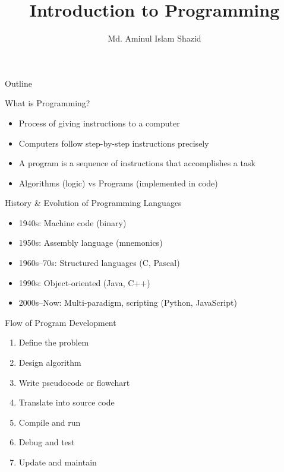 \documentclass[12pt, aspectratio=169]{beamer}
\title{Introduction to Programming}
\author{Md. Aminul Islam Shazid}
\date{}
\begin{document}
    {
		\addtocounter{framenumber}{-2}    %

		\begin{frame}
			\titlepage
		\end{frame}

		\begin{frame}{Outline}
			\tableofcontents[subsectionstyle=hide]
		\end{frame}
	}

    \begin{frame}{What is Programming?}
        \begin{itemize}
            \item Process of giving instructions to a computer
            \item Computers follow step-by-step instructions precisely
            \item A program is a sequence of instructions that accomplishes a task
            \item Algorithms (logic) vs Programs (implemented in code)
        \end{itemize}
    \end{frame}


    \begin{frame}{History \& Evolution of Programming Languages}
        \begin{itemize}
            \item 1940s: Machine code (binary)
            \item 1950s: Assembly language (mnemonics)
            \item 1960s--70s: Structured languages (C, Pascal)
            \item 1990s: Object-oriented (Java, C++)
            \item 2000s--Now: Multi-paradigm, scripting (Python, JavaScript)
        \end{itemize}
    \end{frame}


    \begin{frame}{Flow of Program Development}
        \begin{enumerate}
            \item Define the problem
            \item Design algorithm
            \item Write pseudocode or flowchart
            \item Translate into source code
            \item Compile and run
            \item Debug and test
            \item Update and maintain
        \end{enumerate}
    \end{frame}
\end{document}
